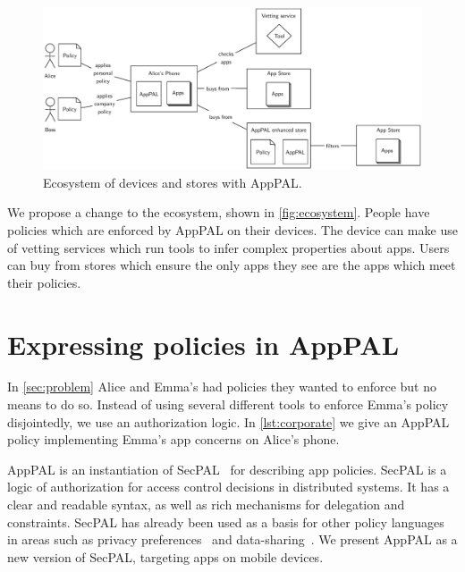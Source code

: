 \documentclass[]{llncs}
\begin{document}
\begin{figure}
\includegraphics{figures/overview.eps}
\caption{Ecosystem of devices and stores with AppPAL.}
\label{fig:ecosystem}
\end{figure}

We propose a change to the ecosystem, shown in \autoref{fig:ecosystem}.
People have policies which are enforced by AppPAL on their devices.
The device can make use of vetting services which run tools to infer complex properties about apps.
Users can buy from stores which ensure the only apps they see are the apps which meet their policies.

\section{Expressing policies in AppPAL}
\label{sec:idea}

In \autoref{sec:problem} Alice and Emma's had policies they wanted to enforce but no means to do so.
Instead of using several different tools to enforce Emma's policy disjointedly, we use an authorization logic.
In \autoref{lst:corporate} we give an AppPAL policy implementing Emma's app concerns on Alice's phone.


AppPAL is an instantiation of SecPAL~\cite{Becker:2006vh} for describing app policies.
SecPAL is a logic of authorization for access control decisions in distributed systems.
It has a clear and readable syntax, as well as rich mechanisms for delegation and constraints.
SecPAL has already been used as a basis for other policy languages in areas such as privacy preferences~\cite{Becker:2009ula} and data-sharing~\cite{Aziz:2011vt}.
We present AppPAL as a new version of SecPAL, targeting apps on mobile devices.
\end{document}
